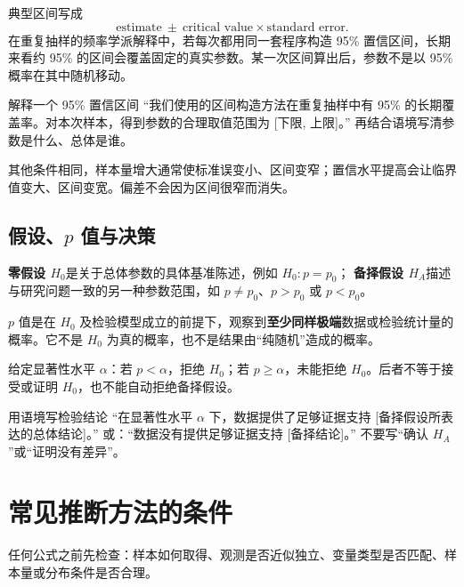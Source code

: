 \documentclass[11pt,a4paper,fontset=fandol]{ctexart}
\begin{document}
典型区间写成
\[
\text{estimate}\ \pm\ \text{critical value}\times\text{standard error}.
\]
在重复抽样的频率学派解释中，若每次都用同一套程序构造 95\% 置信区间，长期来看约 95\% 的区间会覆盖固定的真实参数。某一次区间算出后，参数不是以 95\% 概率在其中随机移动。

\begin{exam}{解释一个 95\% 置信区间}
“我们使用的区间构造方法在重复抽样中有 95\% 的长期覆盖率。对本次样本，得到参数的合理取值范围为 [下限, 上限]。”
再结合语境写清参数是什么、总体是谁。
\end{exam}

其他条件相同，样本量增大通常使标准误变小、区间变窄；置信水平提高会让临界值变大、区间变宽。偏差不会因为区间很窄而消失。

\subsection{假设、\texorpdfstring{$p$}{p} 值与决策}

\textbf{零假设 $H_0$}是关于总体参数的具体基准陈述，例如 $H_0:p=p_0$；
\textbf{备择假设 $H_A$}描述与研究问题一致的另一种参数范围，如 $p\ne p_0$、$p>p_0$ 或 $p<p_0$。

$p$ 值是在 $H_0$ 及检验模型成立的前提下，观察到\textbf{至少同样极端}数据或检验统计量的概率。它不是 $H_0$ 为真的概率，也不是结果由“纯随机”造成的概率。

给定显著性水平 $\alpha$：若 $p<\alpha$，拒绝 $H_0$；若 $p\geq\alpha$，未能拒绝 $H_0$。后者不等于接受或证明 $H_0$，也不能自动拒绝备择假设。

\begin{exam}{用语境写检验结论}
“在显著性水平 $\alpha$ 下，数据提供了足够证据支持 [备择假设所表达的总体结论]。”
或：“数据没有提供足够证据支持 [备择结论]。”
不要写“确认 $H_A$”或“证明没有差异”。
\end{exam}

\section{常见推断方法的条件}

任何公式之前先检查：样本如何取得、观测是否近似独立、变量类型是否匹配、样本量或分布条件是否合理。
\end{document}
